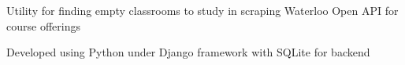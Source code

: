 ﻿\documentclass[letterpaper]{deedy-resume} %
\begin{document}
\begin{minipage}[t]{0.66\textwidth}
        \sectionspace %



        \begin{tightitemize}
                \item Utility for finding empty classrooms to study in scraping Waterloo Open API for course offerings
                \item Developed using Python under Django framework with SQLite for backend
        \end{tightitemize}

        \sectionspace %


\end{minipage} %
\end{document}
